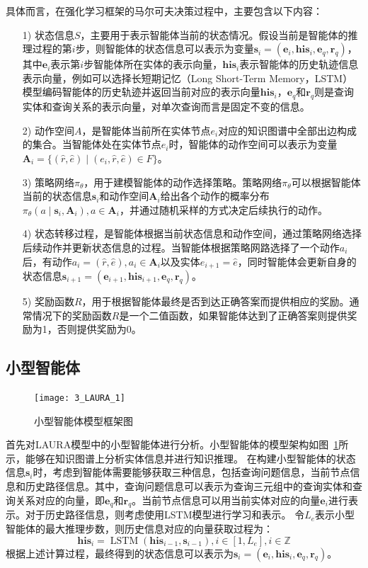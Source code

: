 \documentclass[algorithmlist, AutoFakeBold, AutoFakeSlant, figurelist, tablelist, nomlist, engineering]{seuthesix}
\begin{document}
具体而言，在强化学习框架的马尔可夫决策过程中，主要包含以下内容：
\begin{itemize}
  \item [1)] 状态信息$S$，主要用于表示智能体当前的状态情况。假设当前是智能体的推理过程的第$i$步，则智能体的状态信息可以表示为变量$\bm{s}_i = (\bm{e}_i, \bm{his}_i, \bm{e}_q, \bm{r}_q)$，其中$\bm{e}_i$表示第$i$步智能体所在实体的表示向量，$\bm{his}_i$表示智能体的历史轨迹信息表示向量，例如可以选择长短期记忆（Long Short-Term Memory，LSTM）模型编码智能体的历史轨迹并返回当前对应的表示向量$\bm{his}_i$，$\bm{e}_q$和$\bm{r}_q$则是查询实体和查询关系的表示向量，对单次查询而言是固定不变的信息。
  \item [2)] 动作空间$A$，是智能体当前所在实体节点$e_i$对应的知识图谱中全部出边构成的集合。当智能体处在实体节点$e_i$时，智能体的动作空间可以表示为变量$\bm{A}_i = \{(\hat{r}, \hat{e}) \mid (e_i, \hat{r}, \hat{e}) \in F\}$。
  \item [3)] 策略网络$\pi_\theta$，用于建模智能体的动作选择策略。策略网络$\pi_\theta$可以根据智能体当前的状态信息$\bm{s}_i$和动作空间$\bm{A}_i$给出各个动作的概率分布$\pi_\theta(a \mid \bm{s}_i, \bm{A}_i), a \in \bm{A}_i$，并通过随机采样的方式决定后续执行的动作。
  \item [4)] 状态转移过程，是智能体根据当前状态信息和动作空间，通过策略网络选择后续动作并更新状态信息的过程。当智能体根据策略网路选择了一个动作$a_i$后，有动作$a_i = (\hat{r}, \hat{e}), a_i \in \bm{A}_i$以及实体$e_{i+1}=\hat{e}$，同时智能体会更新自身的状态信息$\bm{s}_{i+1} = (\bm{e}_{i+1}, \bm{his}_{i+1}, \bm{e}_q, \bm{r}_q)$。
  \item [5)] 奖励函数$R$，用于根据智能体最终是否到达正确答案而提供相应的奖励。通常情况下的奖励函数$R$是一个二值函数，如果智能体达到了正确答案则提供奖励为1，否则提供奖励为0。
\end{itemize}

\subsection{小型智能体}
\begin{figure}
  \centering
  \texttt{[image: 3\_LAURA\_1]}
  \caption{小型智能体模型框架图}
  \label{3_LAURA_1}
\end{figure}
首先对LAURA模型中的小型智能体进行分析。小型智能体的模型架构如图~\ref{3_LAURA_1}所示，能够在知识图谱上分析实体信息并进行知识推理。
在构建小型智能体的状态信息$\bm{s}_i$时，考虑到智能体需要能够获取三种信息，包括查询问题信息，当前节点信息和历史路径信息。其中，查询问题信息可以表示为查询三元组中的查询实体和查询关系对应的向量，即$\bm{e}_q$和$\bm{r}_q$。当前节点信息可以用当前实体对应的向量$\bm{e}_i$进行表示。对于历史路径信息，则考虑使用LSTM模型进行学习和表示。
令$L_e$表示小型智能体的最大推理步数，则历史信息对应的向量获取过程为：
\begin{equation}
  \bm{his}_i=\operatorname{LSTM}\left(\bm{his}_{i - 1}, \bm{s}_{i - 1}\right), i \in [1, L_e], i \in \mathbb{Z}
  \label{equation_HistoryLSTM}
\end{equation}
根据上述计算过程，最终得到的状态信息可以表示为$\bm{s}_i = (\bm{e}_i, \bm{his}_i, \bm{e}_q, \bm{r}_q)$。
\end{document}
